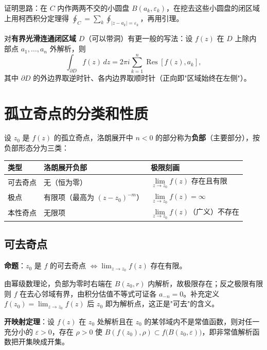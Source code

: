 
证明思路：在 \(C\) 内作两两不交的小圆盘 \(B(a_k,\varepsilon_k)\)，在挖去这些小圆盘的闭区域上用柯西积分定理得 \(\oint_C=\sum_k\oint_{|z-a_k|=\varepsilon_k}\)，再用引理。

对\textbf{有界光滑连通闭区域} \(D\)（可以带洞）有更一般的写法：设 \(f(z)\) 在 \(D\) 上除内部点 \(a_1,\dots,a_n\) 外解析，则
\[
\int_{\partial D}f(z)\,dz=2\pi i\sum_{k=1}^{n}\operatorname{Res}[f(z),a_k],
\]
其中 \(\partial D\) 的外边界取逆时针、各内边界取顺时针（正向即"区域始终在左侧"）。


\section{孤立奇点的分类和性质}

设 \(z_0\) 是 \(f(z)\) 的孤立奇点，洛朗展开中 \(n<0\) 的部分称为\textbf{负部}（主要部分），按负部形态分为三类：

\begin{center}
\begin{tabular}{@{}lll@{}}
\toprule
类型 & 洛朗展开负部 & 极限刻画 \\
\midrule
可去奇点 & 无（恒为零） & \(\lim\limits_{z\to z_0}f(z)\) 存在且有限 \\
极点 & 有限项（最高为 \((z-z_0)^{-m}\)） & \(\lim\limits_{z\to z_0}f(z)=\infty\) \\
本性奇点 & 无限项 & \(\lim\limits_{z\to z_0}f(z)\)（广义）不存在 \\
\bottomrule
\end{tabular}
\end{center}

\subsection{可去奇点}

\textbf{命题}：\(z_0\) 是 \(f\) 的可去奇点 \(\iff \lim_{z\to z_0}f(z)\) 存在有限。

由幂级数理论，负部为零时右端在 \(B(z_0,r)\) 内解析，故极限存在；反之极限有限则 \(f\) 在去心邻域有界，由积分估值不等式可证各 \(a_{-n}=0\)。补充定义 \(f(z_0)=\lim_{z\to z_0}f(z)\) 后 \(z_0\) 即为解析点，这正是"可去"的含义。

\textbf{开映射定理}：设 \(f(z)\) 在 \(z_0\) 处解析且在 \(z_0\) 的某邻域内不是常值函数，则对任一充分小的 \(\varepsilon>0\)，存在 \(\rho>0\) 使 \(B(f(z_0),\rho)\subset f\big(B(z_0,\varepsilon)\big)\)，即非常值解析函数把开集映成开集。

